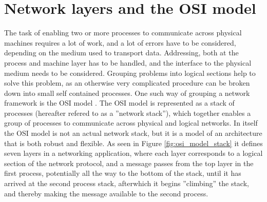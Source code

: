 \section{Network layers and the OSI model}
The task of enabling two or more processes to communicate across physical machines requires a lot of work, and a lot of errors have to be considered, depending on the medium used to transport data. Addressing, both at the process and machine layer has to be handled, and the interface to the physical medium needs to be considered. Grouping problems into logical sections help to solve this problem, as an otherwise very complicated procedure can be broken down into small self contained processes.
One such way of grouping a network framework is the OSI model \cite{[27-42]KOM}. The OSI model is represented as a stack of processes (hereafter refered to as a ''network stack''), which together enables a group of processes to communicate across physical and logical networks.
In itself the OSI model is not an actual network stack, but it is a model of an architecture that is both robust and flexible. 
As seen in Figure \ref{fig:osi_model_stack} it defines seven layers in a networking application, where each layer corresponds to a logical section of the network protocol, and a message passes from the top layer in the first process, potentially all the way to the bottom of the stack, until it has arrived at the second process stack, afterwhich it begins ''climbing'' the stack, and thereby making the message available to the second process.

